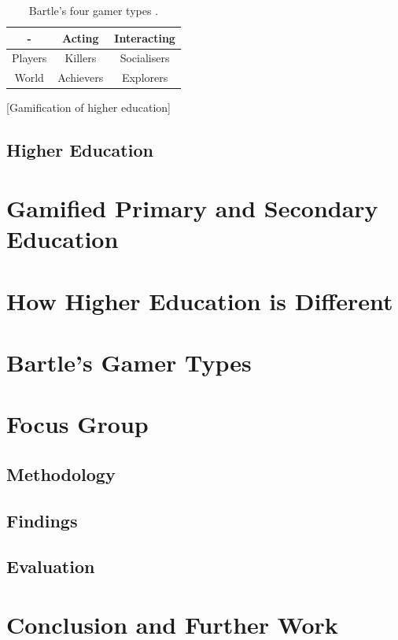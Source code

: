 \documentclass[12pt]{article}
\begin{document}
\begin{table}[p]
\begin{tabular}{|c|c|c|}
	\hline - & Acting & Interacting \\ 
	\hline Players & Killers & Socialisers \\ 
	\hline World & Achievers & Explorers \\ 
	\hline 
\end{tabular}
\caption{Bartle's four gamer types \cite{bartle1996hearts}.}
\label{table:cards}
\end{table}

[Gamification of higher education]

\subsection{Higher Education}

\section{Gamified Primary and Secondary Education}

\section{How Higher Education is Different}

\section{Bartle's Gamer Types}

\section{Focus Group}

\subsection{Methodology}

\subsection{Findings}

\subsection{Evaluation}

\section{Conclusion and Further Work}
\end{document}
